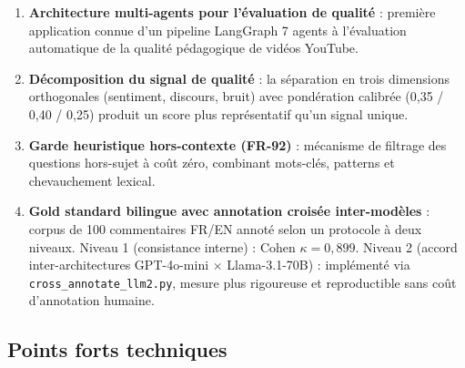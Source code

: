 \documentclass[12pt, a4paper]{article}
\begin{document}
\begin{enumerate}
  \item \textbf{Architecture multi-agents pour l'évaluation de qualité} :
        première application connue d'un pipeline LangGraph 7 agents à
        l'évaluation automatique de la qualité pédagogique de vidéos YouTube.

  \item \textbf{Décomposition du signal de qualité} : la séparation en trois
        dimensions orthogonales (sentiment, discours, bruit) avec pondération
        calibrée (0{,}35 / 0{,}40 / 0{,}25) produit un score plus représentatif
        qu'un signal unique.

  \item \textbf{Garde heuristique hors-contexte (FR-92)} : mécanisme de filtrage
        des questions hors-sujet à coût zéro, combinant mots-clés, patterns
        et chevauchement lexical.

  \item \textbf{Gold standard bilingue avec annotation croisée inter-modèles} :
        corpus de 100 commentaires FR/EN annoté selon un protocole à deux niveaux.
        Niveau 1 (consistance interne) : Cohen $\kappa = 0{,}899$.
        Niveau 2 (accord inter-architectures GPT-4o-mini $\times$ Llama-3.1-70B) :
        implémenté via \texttt{cross\_annotate\_llm2.py}, mesure plus rigoureuse
        et reproductible sans coût d'annotation humaine.
\end{enumerate}

\subsection{Points forts techniques}
\end{document}
